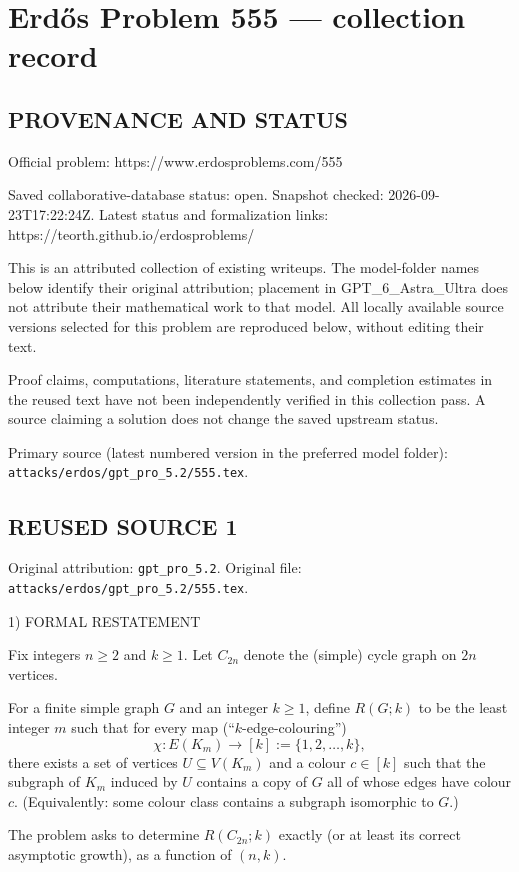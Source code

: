 \section*{Erd\H{o}s Problem 555 --- collection record}

\subsection*{PROVENANCE AND STATUS}
Official problem: https://www.erdosproblems.com/555

Saved collaborative-database status: open.
Snapshot checked: 2026-09-23T17:22:24Z.
Latest status and formalization links: https://teorth.github.io/erdosproblems/

This is an attributed collection of existing writeups. The model-folder names below identify their original attribution; placement in GPT\_6\_Astra\_Ultra does not attribute their mathematical work to that model. All locally available source versions selected for this problem are reproduced below, without editing their text.

Proof claims, computations, literature statements, and completion estimates in the reused text have not been independently verified in this collection pass. A source claiming a solution does not change the saved upstream status.

Primary source (latest numbered version in the preferred model folder): \texttt{attacks/erdos/gpt\_pro\_5.2/555.tex}.

\subsection*{REUSED SOURCE 1}
Original attribution: \texttt{gpt\_pro\_5.2}.
Original file: \texttt{attacks/erdos/gpt\_pro\_5.2/555.tex}.


1) FORMAL RESTATEMENT

Fix integers $n\ge 2$ and $k\ge 1$. Let $C_{2n}$ denote the (simple) cycle graph on $2n$ vertices.

For a finite simple graph $G$ and an integer $k\ge 1$, define $R(G;k)$ to be the least integer $m$ such that for every map (``$k$-edge-colouring'')
\[
\chi:E(K_m)\to [k]:=\{1,2,\dots,k\},
\]
there exists a set of vertices $U\subseteq V(K_m)$ and a colour $c\in [k]$ such that the subgraph of $K_m$ induced by $U$ contains a copy of $G$ all of whose edges have colour $c$.
(Equivalently: some colour class contains a subgraph isomorphic to $G$.)

The problem asks to determine $R(C_{2n};k)$ exactly (or at least its correct asymptotic growth), as a function of $(n,k)$.

